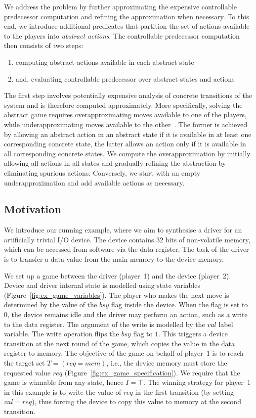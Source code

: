 We address the problem by further approximating the expensive controllable predecessor computation and refining the approximation when necessary. To this end, we introduce additional predicates that partition the set of actions available to the players into \emph{abstract actions}. The controllable predecessor computation then consists of two steps: 

\begin{enumerate}
    \item computing abstract actions available in each abstract state
    \item and, evaluating controllable predecessor over abstract states and actions
\end{enumerate}

The first step involves potentially expensive analysis of concrete transitions of the system and is therefore computed approximately. More specifically, solving the abstract game requires overapproximating moves available to one of the players, while underapproximating moves available to the other~\cite{Henzinger_JM_03}.  The former is achieved by allowing an abstract action in an abstract state if it is available in at least one corresponding concrete state, the latter allows an action only if it is available in all corresponding concrete states. We compute the overapproximation by initially allowing all actions in all states and gradually refining the abstraction by eliminating spurious actions.  Conversely, we start with an empty underapproximation and add available actions as necessary.

\subsection{Motivation}

We introduce our running example, where we aim to synthesise a driver for an artificially trivial I/O device.  The device contains $32$ bits of non-volatile memory, which can be accessed from software via the data register. The task of the driver is to transfer a data value from the main memory to the device memory.

We set up a game between the driver (player~1) and the device (player~2).  Device and driver internal state is modelled using state variables (Figure~\ref{fig:ex_game_variables}).  The player who makes the next move is determined by the value of the $bsy$ flag inside the device.  When the flag is set to $0$, the device remains idle and the driver may perform an action, such as a write to the data register.  The argument of the write is modelled by the $val$ label variable.  The write operation flips the $bsy$ flag to $1$.  This triggers a device transition at the next round of the game, which copies the value in the data register to memory.  The objective of the game on behalf of player~1 is to reach the target set $T=(req=mem)$, i.e., the device memory must store the requested value $req$ (Figure~\ref{fig:ex_game_specification}).  We require that the game is winnable from any state, hence $I=\top$.  The winning strategy for player~1 in this example is to write the value of $req$ in the first transition (by setting $val=req$), thus forcing the device to copy this value to memory at the second transition.

